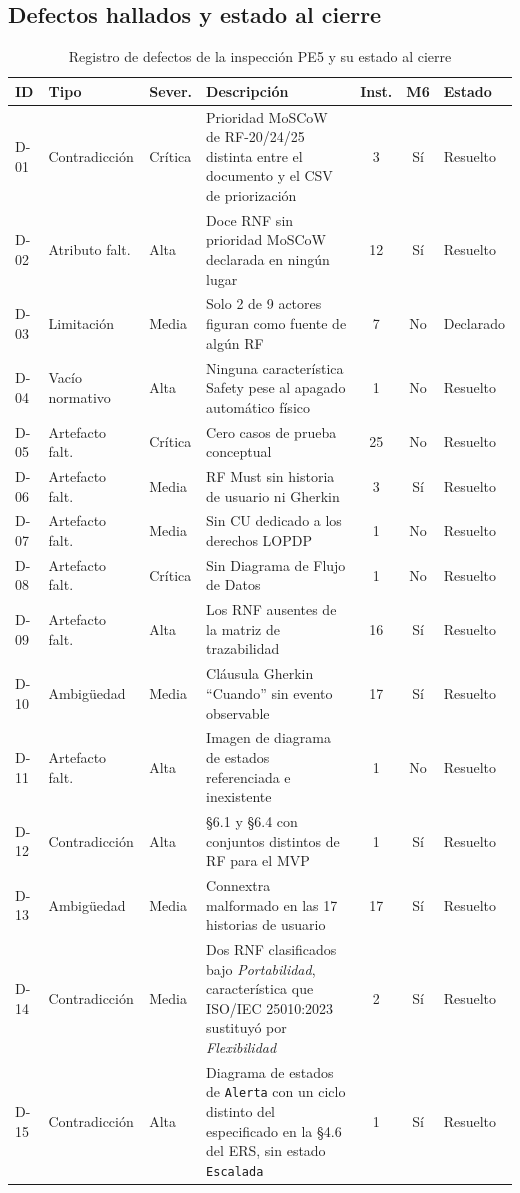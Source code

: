 \subsection{Defectos hallados y estado al cierre}

\begin{table}[H]
\centering
\small
\begin{tabular}{|l|l|l|p{5.6cm}|c|c|l|}
\hline
\textbf{ID} & \textbf{Tipo} & \textbf{Sever.} & \textbf{Descripci\'on} & \textbf{Inst.} & \textbf{M6} & \textbf{Estado} \\ \hline
D-01 & Contradicci\'on & Cr\'itica & Prioridad MoSCoW de RF-20/24/25 distinta entre el documento y el CSV de priorizaci\'on & 3 & S\'i & Resuelto \\ \hline
D-02 & Atributo falt. & Alta & Doce RNF sin prioridad MoSCoW declarada en ning\'un lugar & 12 & S\'i & Resuelto \\ \hline
D-03 & Limitaci\'on & Media & Solo 2 de 9 actores figuran como fuente de alg\'un RF & 7 & No & Declarado \\ \hline
D-04 & Vac\'io normativo & Alta & Ninguna caracter\'istica Safety pese al apagado autom\'atico f\'isico & 1 & No & Resuelto \\ \hline
D-05 & Artefacto falt. & Cr\'itica & Cero casos de prueba conceptual & 25 & No & Resuelto \\ \hline
D-06 & Artefacto falt. & Media & RF Must sin historia de usuario ni Gherkin & 3 & S\'i & Resuelto \\ \hline
D-07 & Artefacto falt. & Media & Sin CU dedicado a los derechos LOPDP & 1 & No & Resuelto \\ \hline
D-08 & Artefacto falt. & Cr\'itica & Sin Diagrama de Flujo de Datos & 1 & No & Resuelto \\ \hline
D-09 & Artefacto falt. & Alta & Los RNF ausentes de la matriz de trazabilidad & 16 & S\'i & Resuelto \\ \hline
D-10 & Ambig\"uedad & Media & Cl\'ausula Gherkin ``Cuando'' sin evento observable & 17 & S\'i & Resuelto \\ \hline
D-11 & Artefacto falt. & Alta & Imagen de diagrama de estados referenciada e inexistente & 1 & No & Resuelto \\ \hline
D-12 & Contradicci\'on & Alta & \S6.1 y \S6.4 con conjuntos distintos de RF para el MVP & 1 & S\'i & Resuelto \\ \hline
D-13 & Ambig\"uedad & Media & Connextra malformado en las 17 historias de usuario & 17 & S\'i & Resuelto \\ \hline
D-14 & Contradicci\'on & Media & Dos RNF clasificados bajo \emph{Portabilidad}, caracter\'istica que ISO/IEC 25010:2023 sustituy\'o por \emph{Flexibilidad} & 2 & S\'i & Resuelto \\ \hline
D-15 & Contradicci\'on & Alta & Diagrama de estados de \texttt{Alerta} con un ciclo distinto del especificado en la \S4.6 del ERS, sin estado \texttt{Escalada} & 1 & S\'i & Resuelto \\ \hline
\end{tabular}
\caption{Registro de defectos de la inspecci\'on PE5 y su estado al cierre}
\label{tab:defectos}
\end{table}

